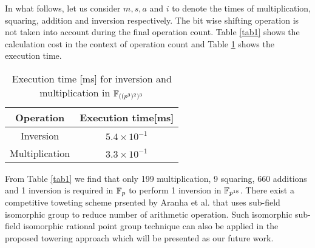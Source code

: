 In what follows, let us consider $m,s,a$ and $i$ to denote the times of multiplication, squaring, addition and inversion respectively. The bit wise shifting operation is not taken into account during the final operation count.
Table \ref{tab1} shows the calculation cost in the context of  operation count and Table \ref{tab3} shows the execution time.
\renewcommand{\baselinestretch}{1.5}
\begin{table}[!ht]
\renewcommand{\arraystretch}{1.3}
\centering
\caption{$\FQTHTWTH$ operation count}
\label{tab1}
\end{table}


\begin{table}[!ht]
\renewcommand{\arraystretch}{1.3}
\centering
\caption{Execution time [ms] for inversion and multiplication in $\FQTHTWTH$}
\label{tab3}
\begin{tabular}{c|c}
\hline 
Operation & Execution time[ms] \\ 
\hline\hline 
Inversion &  $5.4 \times  10^{-1}$ \\
\hline
Multiplication & $3.3 \times  10^{-1}$ \\
\hline  
\end{tabular}
\end{table}
\renewcommand{\baselinestretch}{1.0}
From Table \ref{tab1} we find that only 199 multiplication, 9 squaring, 660 additions and 1 inversion is required in ${\mathbb{F}}_{p}$ to perform 1 inversion in $\mathbb{F}_{p^{18}}$.
There exist a competitive toweting scheme prsented by Aranha et al. \cite{aranha} that uses sub-field isomorphic group to reduce number of arithmetic operation. Such isomorphic sub-field isomorphic rational point group technique can also be applied in the proposed towering approach which will be presented as our future work.
